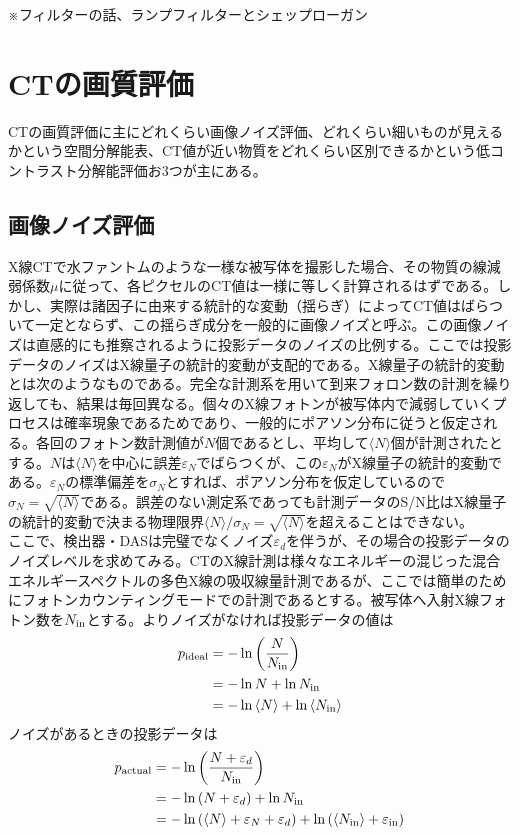 ※フィルターの話、ランプフィルターとシェップローガン

\section{CTの画質評価}
CTの画質評価に主にどれくらい画像ノイズ評価、どれくらい細いものが見えるかという空間分解能表、CT値が近い物質をどれくらい区別できるかという低コントラスト分解能評価お3つが主にある。

\subsection{画像ノイズ評価}
X線CTで水ファントムのような一様な被写体を撮影した場合、その物質の線減弱係数$\mu$に従って、各ピクセルのCT値は一様に等しく計算されるはずである。しかし、実際は諸因子に由来する統計的な変動（揺らぎ）によってCT値はばらついて一定とならず、この揺らぎ成分を一般的に画像ノイズと呼ぶ。この画像ノイズは直感的にも推察されるように投影データのノイズの比例する。ここでは投影データのノイズはX線量子の統計的変動が支配的である。X線量子の統計的変動とは次のようなものである。完全な計測系を用いて到来フォロン数の計測を繰り返しても、結果は毎回異なる。個々のX線フォトンが被写体内で減弱していくプロセスは確率現象であるためであり、一般的にポアソン分布に従うと仮定される。各回のフォトン数計測値が$N$個であるとし、平均して$\langle N \rangle$個が計測されたとする。$N$は$\langle N \rangle$を中心に誤差$\varepsilon_N$でばらつくが、この$\varepsilon_N$がX線量子の統計的変動である。$\varepsilon_N$の標準偏差を$\sigma_N$とすれば、ポアソン分布を仮定しているので$\sigma_N=\sqrt{\langle N \rangle}$である。誤差のない測定系であっても計測データのS/N比はX線量子の統計的変動で決まる物理限界$\langle N \rangle/\sigma_N=\sqrt{\langle N \rangle}$を超えることはできない。\\
ここで、検出器・DASは完璧でなくノイズ$\varepsilon_d$を伴うが、その場合の投影データのノイズレベルを求めてみる。CTのX線計測は様々なエネルギーの混じった混合エネルギースペクトルの多色X線の吸収線量計測であるが、ここでは簡単のためにフォトンカウンティングモードでの計測であるとする。被写体へ入射X線フォトン数を$N_{\rm in}$とする。よりノイズがなければ投影データの値は
\begin{align}
p_{\rm ideal}&=-\ln{\left(\frac{N}{N_{\rm in}}\right)}\\
&=-\ln{N}+\ln{N_{\rm in}}\\
&=-\ln{\langle N \rangle}+\ln{\langle N_{\rm in} \rangle}
\end{align}
ノイズがあるときの投影データは
\begin{align}
p_{\rm actual}&=-\ln{\left( \frac{N+\varepsilon_d}{N_{\rm in}}   \right)}\\
&=-\ln{(N+\varepsilon_d)}+\ln{N_{\rm in}}\\
&=-\ln{(\langle N \rangle + \varepsilon_N + \varepsilon_d)}+\ln{(\langle N_{\rm in} \rangle + \varepsilon_{\rm in})}
\end{align}
